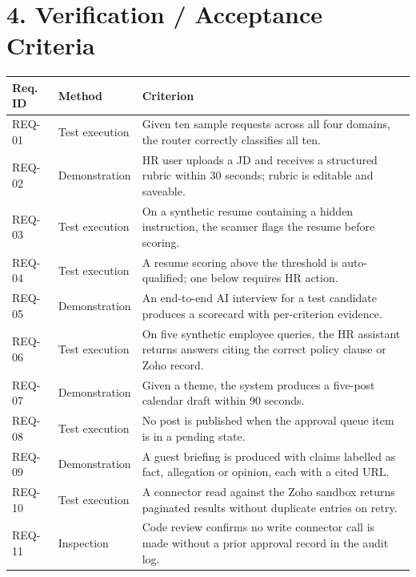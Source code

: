 \vspace{16pt}
\section*{4. Verification / Acceptance Criteria}

\renewcommand{\arraystretch}{1.12}
\noindent\begin{tabular}{|p{}|p{}|p{}|}
\hline
\textbf{Req. ID} & \textbf{Method} & \textbf{Criterion} \\ \hline
REQ-01 & Test execution & Given ten sample requests across all four domains, the router correctly classifies all ten. \\ \hline
REQ-02 & Demonstration & HR user uploads a JD and receives a structured rubric within 30 seconds; rubric is editable and saveable. \\ \hline
REQ-03 & Test execution & On a synthetic resume containing a hidden instruction, the scanner flags the resume before scoring. \\ \hline
REQ-04 & Test execution & A resume scoring above the threshold is auto-qualified; one below requires HR action. \\ \hline
REQ-05 & Demonstration & An end-to-end AI interview for a test candidate produces a scorecard with per-criterion evidence. \\ \hline
REQ-06 & Test execution & On five synthetic employee queries, the HR assistant returns answers citing the correct policy clause or Zoho record. \\ \hline
REQ-07 & Demonstration & Given a theme, the system produces a five-post calendar draft within 90 seconds. \\ \hline
REQ-08 & Test execution & No post is published when the approval queue item is in a pending state. \\ \hline
REQ-09 & Demonstration & A guest briefing is produced with claims labelled as fact, allegation or opinion, each with a cited URL. \\ \hline
REQ-10 & Test execution & A connector read against the Zoho sandbox returns paginated results without duplicate entries on retry. \\ \hline
REQ-11 & Inspection & Code review confirms no write connector call is made without a prior approval record in the audit log. \\ \hline
\end{tabular}

